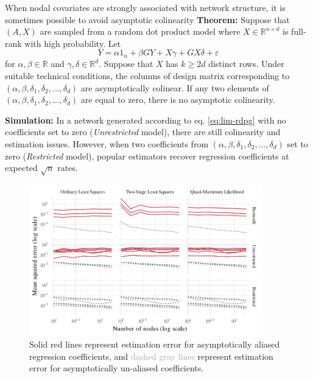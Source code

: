\documentclass[final]{beamer}
\newcommand{\R}{\mathbb{R}}
\newlength{\colwidth}
\begin{document}
\begin{frame}[t]
\begin{columns}[t]
\begin{column}{\colwidth}
\begin{block}{When nodal covariates are strongly associated with network structure, it is sometimes possible to avoid asymptotic colinearity}
                \textbf{Theorem:} Suppose that $(A, X)$ are sampled from a random dot product model where $X \in \mathbb{R}^{n \times d}$ is full-rank with high probability. Let
                \begin{equation} \label{eq:lim-rdpg}
                    Y = \alpha 1_n + \beta G Y + X \gamma + G X \delta + \varepsilon
                \end{equation}
                for $\alpha, \beta \in \R$ and $\gamma, \delta \in \R^d$. Suppose that $X$ has $k \ge 2d$ distinct rows. Under suitable technical conditions, the columns of design matrix corresponding to $(\alpha, \beta, \delta_1, \delta_2, \dots, \delta_d)$ are asymptotically colinear. If any two elements of $(\alpha, \beta, \delta_1, \delta_2, \dots, \delta_d)$ are equal to zero, there is no asymptotic colinearity.

                \textbf{Simulation:} In a network generated according to eq. \eqref{eq:lim-rdpg} with no coefficients set to zero (\emph{Unrestricted} model), there are still colinearity and estimation issues. However, when two coefficients from $(\alpha, \beta, \delta_1, \delta_2, \dots, \delta_d)$ set to zero (\emph{Restricted} model), popular estimators recover regression coefficients at expected $\sqrt{n}$ rates.

                \begin{figure}
                    \centering
                    \includegraphics[width=0.9\textwidth]{./figures/simulations/biometrika-mse-all.pdf}
                    \caption{\textcolor{Mahogany}{Solid red lines} represent estimation error for asymptotically aliased regression coefficients, and \textcolor{darkgray}{dashed gray lines} represent estimation error for asymptotically un-aliased coefficients.}
                \end{figure}


\end{block}
\end{column}
\end{columns}
\end{frame}
\end{document}
